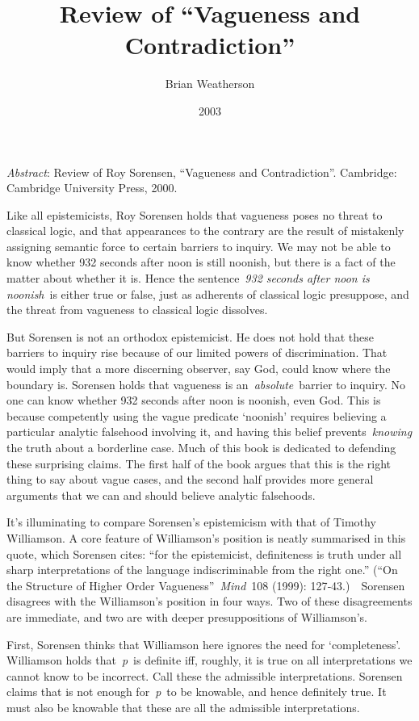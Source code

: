 \documentclass[
  11pt,
  letterpaper,
  DIV=11,
  numbers=noendperiod,
  twoside]{scrartcl}
\title{Review of ``Vagueness and Contradiction''}
\author{Brian Weatherson}
\date{2003}
\renewenvironment{abstract}
 {\vspace{-1.25cm}
 \quotation\small\noindent\emph{Abstract}:}
 {\endquotation}
\renewenvironment{abstract}
 {\quotation\small\noindent\emph{Abstract}:}
 {\endquotation\vspace{-0.02cm}}
\begin{document}
\maketitle
\begin{abstract}
Review of Roy Sorensen, ``Vagueness and Contradiction''. Cambridge:
Cambridge University Press, 2000.
\end{abstract}


Like all epistemicists, Roy Sorensen holds that vagueness poses no
threat to classical logic, and that appearances to the contrary are the
result of mistakenly assigning semantic force to certain barriers to
inquiry. We may not be able to know whether 932 seconds after noon is
still noonish, but there is a fact of the matter about whether it is.
Hence the sentence~\emph{932 seconds after noon is noonish}~is either
true or false, just as adherents of classical logic presuppose, and the
threat from vagueness to classical logic dissolves.

But Sorensen is not an orthodox epistemicist. He does not hold that
these barriers to inquiry rise because of our limited powers of
discrimination. That would imply that a more discerning observer, say
God, could know where the boundary is. Sorensen holds that vagueness is
an~\emph{absolute}~barrier to inquiry. No one can know whether 932
seconds after noon is noonish, even God. This is because competently
using the vague predicate `noonish' requires believing a particular
analytic falsehood involving it, and having this belief
prevents~\emph{knowing} the truth about a borderline case. Much of this
book is dedicated to defending these surprising claims. The first half
of the book argues that this is the right thing to say about vague
cases, and the second half provides more general arguments that we can
and should believe analytic falsehoods.

It's illuminating to compare Sorensen's epistemicism with that of
Timothy Williamson. A core feature of Williamson's position is neatly
summarised in this quote, which Sorensen cites: ``for the epistemicist,
definiteness is truth under all sharp interpretations of the language
indiscriminable from the right one.'' (``On the Structure of Higher
Order Vagueness''~\emph{Mind}~108 (1999): 127‑43.)~~Sorensen disagrees
with the Williamson's position in four ways. Two of these disagreements
are immediate, and two are with deeper presuppositions of Williamson's.

First, Sorensen thinks that Williamson here ignores the need for
`completeness'. Williamson holds that~\emph{p}~is definite iff, roughly,
it is true on all interpretations we cannot know to be incorrect. Call
these the admissible interpretations. Sorensen claims that is not enough
for~\emph{p}~to be knowable, and hence definitely true. It must also be
knowable that these are all the admissible interpretations.
\end{document}
